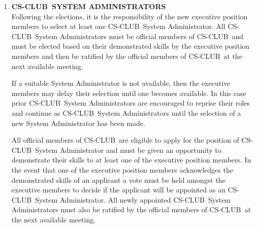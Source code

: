 \documentclass{article}
\providecommand{\csclub}{{\scshape CS-CLUB~}}
\begin{document}
\begin{enumerate}
The nomination period will begin at least one week prior to the announced date and time of the election and will be open until the last weekend prior to the election the following weekday. After the nomination period has closed the final election for the executive positions will take place during a weekday of the following week after the nomination close. The election period will be open for 24 hours, during which time all registered club members may place their vote. After the close of the election the results will be reviewed by each of the current executive position members and the results of the election period will be announced.

If an event occurs, such as a removal or lack of nominations, which results in a vacant executive position, elections for such posts may not be held at the election meeting, but elections for such posts may be held at a later date, in accordance with the election procedures. The decision to hold an addition election meeting for the vacant position remains at the discretion of the executive position members, who make the final decision of whether or not an addition election meeting is necessary.


\item{\bf \csclub SYSTEM ADMINISTRATORS}\\[0.6em]
Following the elections, it is the responsibility of the new executive position members to select at least one \csclub System Administrator. All \csclub System  Administrators must be official members of \csclub and must be elected based on their demonstrated skills by the executive position members and then be ratified by the official members of \csclub at the next available meeting.
	
If a suitable System Administrator is not available, then the executive members may delay their selection until one becomes available. In this case prior \csclub System Administrators are encouraged to reprise their roles and continue as \csclub System Administrators until the selection of a new System Administrator has been made.
	
All official members of \csclub are eligible to apply for the position of \csclub System Administrator and must be given an opportunity to demonstrate their skills to at least one of the executive position members. In the event that one of the executive position members acknowledges the demonstrated skills of an applicant a vote must be held amongst the executive members to decide if the applicant will be appointed as an \csclub System Administrator. All newly appointed \csclub System Administrators must also be ratified by the official members of \csclub at the next available meeting.

\end{enumerate}
\end{document}
